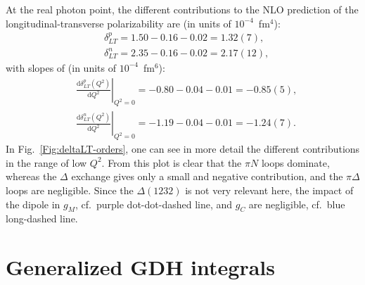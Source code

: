 \documentclass[twocolumn,prc,showpacs,nofootinbib,preprintnumbers,amsmath,amssymb,superscriptaddress]{revtex4-1}
\def\dd{\mathrm{d}}
\begin{document}
At the real photon point, the different contributions to the NLO prediction of the longitudinal-transverse polarizability are (in units of $10^{-4}$~fm$^4$):
\begin{align}\label{Eq:deltaLTRealPoint}
&\delta^p_{LT} = 1.50 -0.16 -0.02 = 1.32(7), \\
&\delta^n_{LT} = 2.35 -0.16 -0.02 =2.17(12), 
\end{align}
with slopes of (in units of $10^{-4}$~fm$^6$):
\begin{align}
&\left.\frac{\dd\delta_{LT}^p (Q^2)}{\dd Q^2}\right|_{Q^2=0}=  -0.80 - 0.04 - 0.01 = -0.85(5),\\
&\left.\frac{\dd\delta_{LT}^n (Q^2)}{\dd Q^2}\right|_{Q^2=0}=  -1.19 - 0.04 -0.01 = -1.24(7).
\end{align}
In Fig.~\ref{Fig:deltaLT-orders}, one can see in more detail the different contributions in the range of low $Q^2$.
From this plot is clear that the $\pi N$ loops dominate, whereas the $\Delta$ exchange gives only a small and negative contribution, and the $\pi \Delta$ loops are negligible. 
Since the $\Delta(1232)$ is not very relevant here, the impact of the dipole in $g_M$, cf.\ purple dot-dot-dashed line, and $g_C$ are negligible, cf.\ blue long-dashed line.





\section{Generalized GDH integrals}
\label{Sec:GeneralizedGDH}
\end{document}
